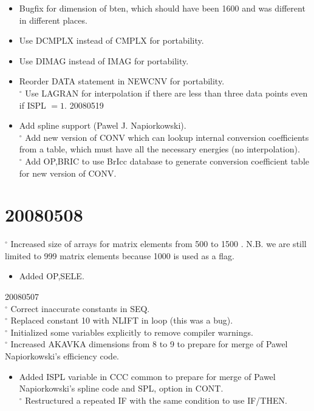 \documentclass[10pt]{article}
\begin{document}
\begin{itemize}
  \item Bugfix for dimension of bten, which should have been 1600 and was different in different places.
  \item Use DCMPLX instead of CMPLX for portability.
  \item Use DIMAG instead of IMAG for portability.
  \item Reorder DATA statement in NEWCNV for portability.\\
${ }^{\circ}$ Use LAGRAN for interpolation if there are less than three data points even if ISPL $=1$. 20080519
  \item Add spline support (Pawel J. Napiorkowski).\\
${ }^{\circ}$ Add new version of CONV which can lookup internal conversion coefficients from a table, which must have all the necessary energies (no interpolation).\\
${ }^{\circ}$ Add OP,BRIC to use BrIcc database to generate conversion coefficient table for new version of CONV.
\end{itemize}

\section*{20080508}
${ }^{\circ}$ Increased size of arrays for matrix elements from 500 to 1500 . N.B. we are still limited to 999 matrix elements because 1000 is used as a flag.

\begin{itemize}
  \item Added OP,SELE.
\end{itemize}

20080507\\
${ }^{\circ}$ Correct inaccurate constants in SEQ.\\
${ }^{\circ}$ Replaced constant 10 with NLIFT in loop (this was a bug).\\
${ }^{\circ}$ Initialized some variables explicitly to remove compiler warnings.\\
${ }^{\circ}$ Increased AKAVKA dimensions from 8 to 9 to prepare for merge of Pawel Napiorkowski's efficiency code.

\begin{itemize}
  \item Added ISPL variable in CCC common to prepare for merge of Pawel Napiorkowski's spline code and SPL, option in CONT.\\
${ }^{\circ}$ Restructured a repeated IF with the same condition to use IF/THEN.
\end{itemize}
\end{document}
